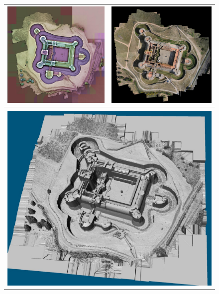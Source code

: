 \begin{figure}
\begin{tabular}{||c|c||}
\hline \hline 
\includegraphics[width=80 mm]{FIGS/SAMPLES/Salse2.jpg}&
\includegraphics[width=80 mm]{FIGS/SAMPLES/Ortho-Test-Redr.jpg} \\ \hline  \hline 
\\ \multicolumn{2}{|c|}{\includegraphics[width=160 mm]{FIGS/SAMPLES/SlsMNE_1_25.jpg}} \\ \hline  \hline

\end{tabular}
\end{figure}
